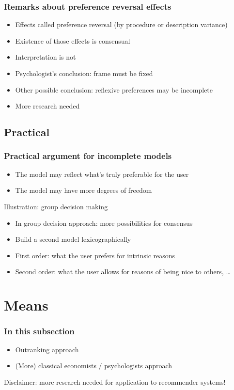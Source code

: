 \documentclass[french,english]{beamer}
\begin{document}
\begin{frame}
	\frametitle{Remarks about preference reversal effects}
	\begin{itemize}
		\item Effects called preference reversal (by procedure or description variance)
		\item Existence of those effects is consensual
		\item Interpretation is not
		\item Psychologist’s conclusion: frame must be fixed
		\item Other possible conclusion: reflexive preferences may be incomplete
		\item More research needed
	\end{itemize}
\end{frame}

\subsection{Practical}
\begin{frame}
	\frametitle{Practical argument for incomplete models}
	\begin{itemize}
		\item The model may reflect what’s truly preferable for the user
		\item The model may have more degrees of freedom
	\end{itemize}
	\begin{block}{Illustration: group decision making}
		\begin{itemize}
			\item In group decision approach: more possibilities for consensus
			\item Build a second model lexicographically
			\item First order: what the user prefers for intrinsic reasons
			\item Second order: what the user allows for reasons of being nice to others, …
		\end{itemize}
	\end{block}
\end{frame}

\section{Means}
\begin{frame}
	\frametitle{In this subsection}
	\begin{itemize}
		\item Outranking approach
		\item (More) classical economists / psychologists approach
	\end{itemize}
	Disclaimer: more research needed for application to recommender systems!
\end{frame}
\end{document}
